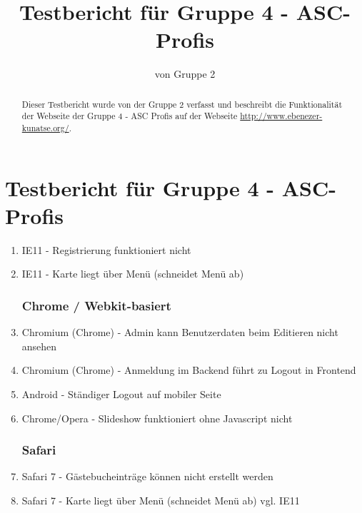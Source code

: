 \documentclass[10pt,a4paper]{scrartcl}
\title{Testbericht für Gruppe 4 - ASC-Profis}
\author{von Gruppe 2}
\begin{document}
\maketitle

\begin{abstract}
Dieser Testbericht wurde von der Gruppe 2 verfasst und beschreibt die Funktionalität der Webseite der Gruppe 4 - ASC Profis auf der Webseite \url{http://www.ebenezer-kunatse.org/}.
\end{abstract}

\section{Testbericht für Gruppe 4 - ASC-Profis}
\begin{enumerate}
\subsection{Allgemeine Fehler}

\subsubsection{Internet Explorer}
\item IE11 - Registrierung funktioniert nicht
\item IE11 - Karte liegt über Menü (schneidet Menü ab)

\subsubsection{Chrome / Webkit-basiert}
\item Chromium (Chrome) - Admin kann Benutzerdaten beim Editieren nicht ansehen
\item Chromium (Chrome) - Anmeldung im Backend führt zu Logout in Frontend
\item Android - Ständiger Logout auf mobiler Seite
\item Chrome/Opera - Slideshow funktioniert ohne Javascript nicht

\subsubsection{Safari}
\item Safari 7 - Gästebucheinträge können nicht erstellt werden
\item Safari 7 - Karte liegt über Menü (schneidet Menü ab) vgl. IE11


\end{enumerate}
\end{document}
